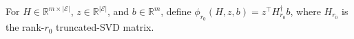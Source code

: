 For \(H\in\mathbb R^{m\times\lvert\mathcal E\rvert}\), \(z\in\mathbb R^{\lvert\mathcal E\rvert}\), and \(b\in\mathbb R^m\), define \(\phi_{r_0}(H,z,b)=z^{\top}H_{r_0}^{\dagger}b\), where \(H_{r_0}\) is the rank-\(r_0\) truncated-SVD matrix.